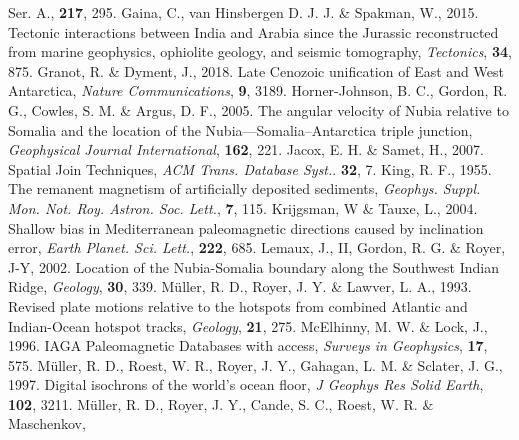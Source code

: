 \begin{thebibliography}{}
{  Ser. A.}, \textbf{217}, 295.
  Gaina, C., van Hinsbergen D. J. J. \& Spakman, W., 2015. Tectonic interactions
  between India and Arabia since the Jurassic reconstructed from marine
  geophysics, ophiolite geology, and seismic tomography, \textit{Tectonics},
  \textbf{34}, 875.
  Granot, R. \& Dyment, J., 2018. Late Cenozoic unification of East and West
  Antarctica, \textit{Nature Communications}, \textbf{9}, 3189.
  Horner-Johnson, B. C., Gordon, R. G., Cowles, S. M. \& Argus, D. F., 2005.
  The angular velocity of Nubia relative to Somalia and the location of the
  Nubia—Somalia–Antarctica triple junction, \textit{Geophysical Journal
  International}, \textbf{162}, 221.
  Jacox, E. H. \& Samet, H., 2007. Spatial Join Techniques, \textit{ACM Trans.
  Database Syst.}. \textbf{32}, 7.
  King, R. F., 1955. The remanent magnetism of artificially deposited sediments,
  \textit{Geophys. Suppl. Mon. Not. Roy. Astron. Soc. Lett.}, \textbf{7},
  115.
  Krijgsman, W \& Tauxe, L., 2004. Shallow bias in Mediterranean paleomagnetic
  directions caused by inclination error, \textit{Earth Planet. Sci. Lett.},
  \textbf{222}, 685.
  Lemaux, J., II, Gordon, R. G. \& Royer, J-Y, 2002. Location of the
  Nubia-Somalia boundary along the Southwest Indian Ridge, \textit{Geology},
  \textbf{30}, 339.
  M{\"{u}}ller, R. D., Royer, J. Y. \& Lawver, L. A., 1993. Revised plate
  motions relative to the hotspots from combined Atlantic and Indian-Ocean
  hotspot tracks, \textit{Geology}, \textbf{21}, 275.
  McElhinny, M. W. \& Lock, J., 1996. IAGA Paleomagnetic Databases with access,
  \textit{Surveys in Geophysics}, \textbf{17}, 575.
  M{\"{u}}ller, R. D., Roest, W. R., Royer, J. Y., Gahagan, L. M. \& Sclater,
  J. G., 1997. Digital isochrons of the world's ocean floor, \textit{J Geophys
  Res Solid Earth}, \textbf{102}, 3211.
  M{\"{u}}ller, R. D., Royer, J. Y., Cande, S. C., Roest, W. R. \& Maschenkov,

\end{thebibliography}

